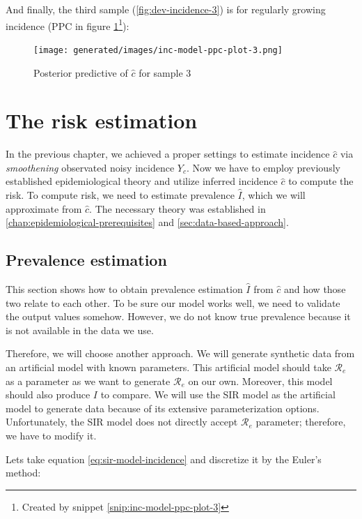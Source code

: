 \documentclass[
  digital, %
  oneside, %
  lof,     %
  lot,     %
]{fithesis4}
\begin{document}
And finally, the third sample (\ref{fig:dev-incidence-3}) is for regularly growing incidence (PPC in figure \ref{fig:incidence-posterior-3}\footnote{Created by snippet \ref{snip:inc-model-ppc-plot-3}}):

\begin{figure}[H]
  \centering
  \texttt{[image: generated/images/inc-model-ppc-plot-3.png]}
  \caption{Posterior predictive of $\hat{c}$ for sample 3}
  \label{fig:incidence-posterior-3}
\end{figure}


\chapter{The risk estimation}

In the previous chapter, we achieved a proper settings to estimate incidence $\hat{c}$ via \textit{smoothening} observated noisy incidence $Y_c$.
Now we have to employ previously established epidemiological theory and utilize inferred incidence $\hat{c}$ to compute the risk.
To compute risk, we need to estimate prevalence $\hat{I}$, which we will approximate from $\hat{c}$.
The necessary theory was established in \autoref{chap:epidemiological-prerequisites} and \autoref{sec:data-based-approach}.


\section{Prevalence estimation}

This section shows how to obtain prevalence estimation $\hat{I}$ from $\hat{c}$ and how those two relate to each other.
To be sure our model works well, we need to validate the output values somehow. However, we do not know true prevalence because it is not available in the data we use.

Therefore, we will choose another approach.
We will generate synthetic data from an artificial model with known parameters.
This artificial model should take $\mathcal{R}_e$ as a parameter as we want to generate $\mathcal{R}_e$ on our own.
Moreover, this model should also produce $I$ to compare.
We will use the SIR model as the artificial model to generate data because of its extensive parameterization options. Unfortunately, the SIR model does not directly accept $\mathcal{R}_e$ parameter; therefore, we have to modify it.

Lets take equation \ref{eq:sir-model-incidence} and discretize it by the Euler's method:
\end{document}
